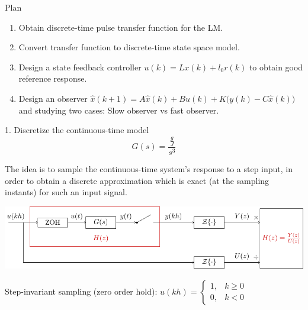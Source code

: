 \documentclass[presentation,aspectratio=169]{beamer}
\begin{document}
\begin{frame}[label={sec:orgd1535e0}]{Plan}
\begin{enumerate}
\item Obtain discrete-time pulse transfer function for the LM.
\item Convert transfer function to discrete-time state space model.
\item Design a state feedback controller \(u(k) = Lx(k) + l_0r(k)\) to obtain good reference response.
\item Design an observer \(\hat{x}(k+1) = A\hat{x}(k) + B u(k) + K\big(y(k) - C\hat{x}(k)\big)\) and studying two cases: \alert{Slow observer vs fast observer.}
\end{enumerate}
\end{frame}


\begin{frame}[label={sec:org147d5b5}]{1. Discretize the continuous-time model}
\[ G(s) = \frac{\frac{g}{J} }{s^3}\]

The idea is to sample the continuous-time system's response to a step input, in order to obtain a discrete approximation which is \alert{exact} (at the sampling instants) for such an input signal. 

\begin{center}
\includegraphics[width=0.9\linewidth]{../../figures/invariant-sampling.pdf}
\end{center}

Step-invariant sampling (zero order hold): \(u(kh) = \begin{cases} 1, & k \ge 0\\0, & k<0 \end{cases}\)
\end{frame}
\end{document}
